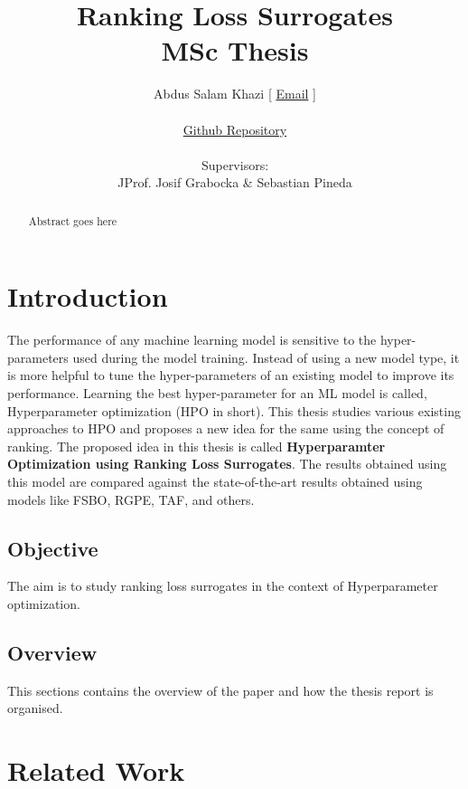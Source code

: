 \documentclass[11pt]{report}
\title {Ranking Loss Surrogates \\[1ex] \large MSc Thesis}
\author{
        Abdus Salam Khazi [
        \href{mailto:abdus.khazi@students.uni-freiburg.de}
                {Email} ]\\ \\
        \href{https://github.com/abduskhazi/ranking-loss-surrogates.git}
                {Github Repository} \cite{github_repository} \\ \\
        Supervisors:
        \begin{tabular}{ll}
             JProf. Josif Grabocka \&
			Sebastian Pineda
		\end{tabular}
       }
\begin{document}


\maketitle
\date{}

\newpage
{}
\begin{abstract}

Abstract goes here

\end{abstract}

\newpage

\tableofcontents
\newpage
\newpage


\chapter{Introduction}

The performance of any machine learning model is sensitive to the hyper-parameters used during the model training. 
Instead of using a new model type, it is more helpful to tune the hyper-parameters of an existing model to improve its performance.
Learning the best hyper-parameter for an ML model is called, Hyperparameter optimization (HPO in short).
This thesis studies various existing approaches to HPO and proposes a new idea for the same using the concept of ranking.
The proposed idea in this thesis is called \textbf{Hyperparamter Optimization using Ranking Loss Surrogates}. 
The results obtained using this model are compared against the state-of-the-art results obtained using models like FSBO,  RGPE,  TAF, and others. 

\label{ProblemOverviewlabel}

\section{Objective}
The aim is to study ranking loss surrogates in the context of Hyperparameter optimization.

\section{Overview}
This sections contains the overview of the paper and how the thesis report is organised.


\chapter{Related Work}\label{chap:relatedWork}
\end{document}
